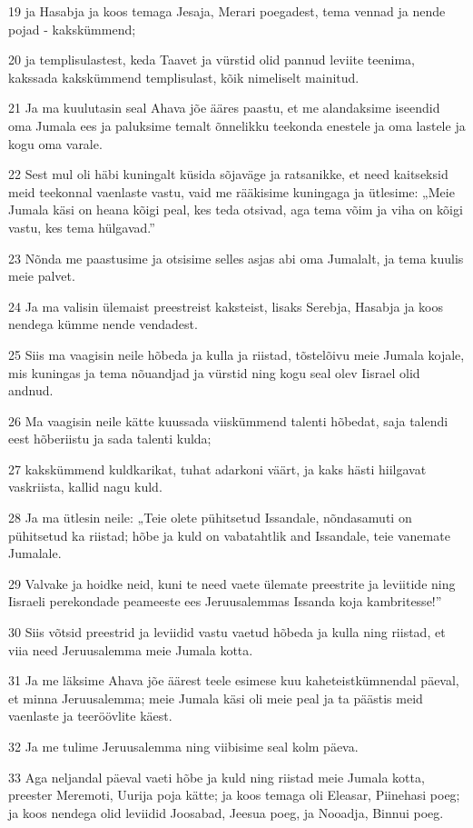 \par 19 ja Hasabja ja koos temaga Jesaja, Merari poegadest, tema vennad ja nende pojad - kakskümmend;
\par 20 ja templisulastest, keda Taavet ja vürstid olid pannud leviite teenima, kakssada kakskümmend templisulast, kõik nimeliselt mainitud.
\par 21 Ja ma kuulutasin seal Ahava jõe ääres paastu, et me alandaksime iseendid oma Jumala ees ja paluksime temalt õnnelikku teekonda enestele ja oma lastele ja kogu oma varale.
\par 22 Sest mul oli häbi kuningalt küsida sõjaväge ja ratsanikke, et need kaitseksid meid teekonnal vaenlaste vastu, vaid me rääkisime kuningaga ja ütlesime: „Meie Jumala käsi on heana kõigi peal, kes teda otsivad, aga tema võim ja viha on kõigi vastu, kes tema hülgavad.”
\par 23 Nõnda me paastusime ja otsisime selles asjas abi oma Jumalalt, ja tema kuulis meie palvet.
\par 24 Ja ma valisin ülemaist preestreist kaksteist, lisaks Serebja, Hasabja ja koos nendega kümme nende vendadest.
\par 25 Siis ma vaagisin neile hõbeda ja kulla ja riistad, tõstelõivu meie Jumala kojale, mis kuningas ja tema nõuandjad ja vürstid ning kogu seal olev Iisrael olid andnud.
\par 26 Ma vaagisin neile kätte kuussada viiskümmend talenti hõbedat, saja talendi eest hõberiistu ja sada talenti kulda;
\par 27 kakskümmend kuldkarikat, tuhat adarkoni väärt, ja kaks hästi hiilgavat vaskriista, kallid nagu kuld.
\par 28 Ja ma ütlesin neile: „Teie olete pühitsetud Issandale, nõndasamuti on pühitsetud ka riistad; hõbe ja kuld on vabatahtlik and Issandale, teie vanemate Jumalale.
\par 29 Valvake ja hoidke neid, kuni te need vaete ülemate preestrite ja leviitide ning Iisraeli perekondade peameeste ees Jeruusalemmas Issanda koja kambritesse!”
\par 30 Siis võtsid preestrid ja leviidid vastu vaetud hõbeda ja kulla ning riistad, et viia need Jeruusalemma meie Jumala kotta.
\par 31 Ja me läksime Ahava jõe äärest teele esimese kuu kaheteistkümnendal päeval, et minna Jeruusalemma; meie Jumala käsi oli meie peal ja ta päästis meid vaenlaste ja teeröövlite käest.
\par 32 Ja me tulime Jeruusalemma ning viibisime seal kolm päeva.
\par 33 Aga neljandal päeval vaeti hõbe ja kuld ning riistad meie Jumala kotta, preester Meremoti, Uurija poja kätte; ja koos temaga oli Eleasar, Piinehasi poeg; ja koos nendega olid leviidid Joosabad, Jeesua poeg, ja Nooadja, Binnui poeg.
